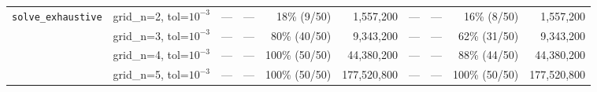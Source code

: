 \begin{table}[t]
{\begin{tabular}{ll rrrr rrrr}
\midrule
\multirow{4}{*}{\texttt{solve\_exhaustive}}
& grid\_n=2, tol=$10^{-3}$ & --- & --- & 18\% (9/50) & 1{,}557{,}200 & --- & --- & 16\% (8/50) & 1{,}557{,}200 \\
& grid\_n=3, tol=$10^{-3}$ & --- & --- & 80\% (40/50) & 9{,}343{,}200 & --- & --- & 62\% (31/50) & 9{,}343{,}200 \\
& grid\_n=4, tol=$10^{-3}$ & --- & --- & 100\% (50/50) & 44{,}380{,}200 & --- & --- & 88\% (44/50) & 44{,}380{,}200 \\
& grid\_n=5, tol=$10^{-3}$ & --- & --- & 100\% (50/50) & 177{,}520{,}800 & --- & --- & 100\% (50/50) & 177{,}520{,}800 \\
\bottomrule
\end{tabular}%
}
\end{table}
